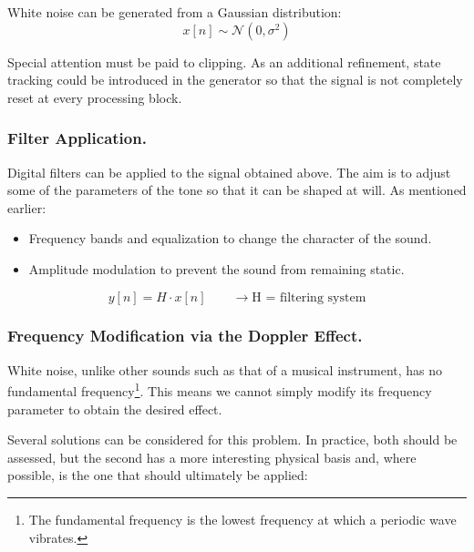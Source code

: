 \documentclass[10.5pt]{article}
\begin{document}
	White noise can be generated from a Gaussian distribution:
	\begin{equation*}
		x[n] \sim \mathcal{N}(0, \sigma ^2)
	\end{equation*}
	
	Special attention must be paid to clipping. As an additional refinement, state tracking could be introduced in the generator so that the signal is not completely reset at every processing block.
	
	\subsubsection{Filter Application.}
	
	Digital filters can be applied to the signal obtained above. The aim is to adjust some of the parameters of the tone so that it can be shaped at will. As mentioned earlier:
	
	\begin{itemize}
		\item Frequency bands and equalization to change the character of the sound.
		\item Amplitude modulation to prevent the sound from remaining static.
	\end{itemize}
	
	\begin{equation*}
		y[n] = H \cdot { x[n]} \qquad \rightarrow \text{H = filtering system}
	\end{equation*}
	
	\subsubsection{Frequency Modification via the Doppler Effect.}
	
	White noise, unlike other sounds such as that of a musical instrument, has no fundamental frequency\footnote{The fundamental frequency is the lowest frequency at which a periodic wave vibrates.}. This means we cannot simply modify its frequency parameter to obtain the desired effect. 
	
	Several solutions can be considered for this problem. In practice, both should be assessed, but the second has a more interesting physical basis and, where possible, is the one that should ultimately be applied:
	
\end{document}
